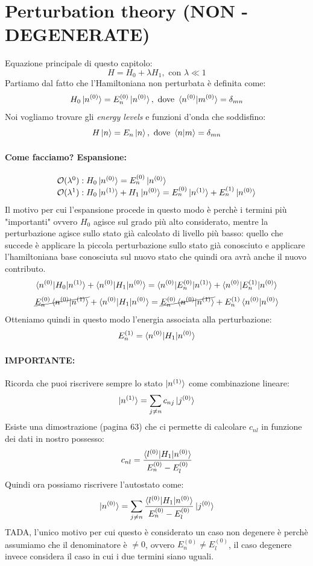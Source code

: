 \section{Perturbation theory (NON - DEGENERATE)}

Equazione principale di questo capitolo:
$$H = H_0 + \lambda H_1, \text{ con } \lambda \ll 1$$
Partiamo dal fatto che l'Hamiltoniana non perturbata è definita come:
$$H_0\ket{n^{(0)}} = E_n^{(0)}\ket{n^{(0)}}, \text{ dove } \braket{n^{(0)}|m^{(0)}} = \delta_{mn}$$
Noi vogliamo trovare gli \textit{energy levels} e funzioni d'onda che soddisfino:
$$H\ket{n} = E_n\ket{n}, \text{ dove } \braket{n|m} = \delta_{mn}$$
\paragraph{Come facciamo? Espansione:}
$$
\begin{array}{l}
	\mathcal{O}(\lambda^0): H_0\ket{n^{(0)}} = E_n^{(0)}\ket{n^{(0)}}\\
	\mathcal{O}(\lambda^1): H_0\ket{n^{(1)}} + H_1\ket{n^{(0)}} = E_n^{(0)}\ket{n^{(1)}} + E_n^{(1)}\ket{n^{(0)}}
\end{array}
$$
Il motivo per cui l'espansione procede in questo modo è perchè i termini più "importanti" ovvero $H_0$ agisce sul grado più alto considerato, mentre la perturbazione agisce sullo stato già calcolato di livello più basso: quello che succede è applicare la piccola perturbazione sullo stato già conosciuto e applicare l'hamiltoniana base conosciuta sul nuovo stato che quindi ora avrà anche il nuovo contributo.
$$\braket{n^{(0)}|H_0|n^{(1)}} + \braket{n^{(0)}|H_1|n^{(0)}} = \braket{n^{(0)}|E_n^{(0)}|n^{(1)}} + \braket{n^{(0)}|E_n^{(1)}|n^{(0)}}$$
$$\cancel{E_n^{(0)}\braket{n^{(0)}|n^{(1)}}} + \braket{n^{(0)}|H_1|n^{(0)}} = \cancel{E_n^{(0)}\braket{n^{(0)}|n^{(1)}}} + E_n^{(1)} \braket{n^{(0)}|n^{(0)}}$$
Otteniamo quindi in questo modo l'energia associata alla perturbazione:
$$E_n^{(1)} = \braket{n^{(0)}|H_1|n^{(0)}}$$
\paragraph{IMPORTANTE:} Ricorda che puoi riscrivere sempre lo stato $\ket{n^{(1)}}$ come combinazione lineare:
$$\ket{n^{(1)}} = \sum_{j \neq n} c_{nj}\ket{j^{(0)}}$$
Esiste una dimostrazione (pagina 63) che ci permette di calcolare $c_{nl}$ in funzione dei dati in nostro possesso:
$$c_{nl} = \frac{\braket{l^{(0)}|H_1|n^{(0)}}}{E_n^{(0)}-E_l^{(0)}}$$
Quindi ora possiamo riscrivere l'autostato come:
$$\ket{n^{(0)}} = \sum_{j \neq n} \frac{\braket{l^{(0)}|H_1|n^{(0)}}}{E_n^{(0)}-E_l^{(0)}} \ket{j^{(0)}}$$
TADA, l'unico motivo per cui questo è considerato un caso non degenere è perchè assumiamo che il denominatore è $\neq 0$, ovvero $E_n^{(0)} \neq E_l^{(0)}$, il caso degenere invece considera il caso in cui i due termini siano uguali.

